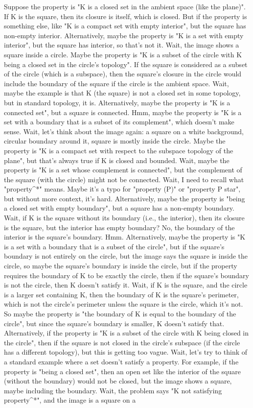 Suppose the property is "K is a closed set in the ambient space (like the plane)". If K is the square, then its closure is itself, which is closed. But if the property is something else, like "K is a compact set with empty interior", but the square has non-empty interior. Alternatively, maybe the property is "K is a set with empty interior", but the square has interior, so that's not it. Wait, the image shows a square inside a circle. Maybe the property is "K is a subset of the circle with K being a closed set in the circle's topology". If the square is considered as a subset of the circle (which is a subspace), then the square's closure in the circle would include the boundary of the square if the circle is the ambient space. Wait, maybe the example is that K (the square) is not a closed set in some topology, but in standard topology, it is. Alternatively, maybe the property is "K is a connected set", but a square is connected. Hmm, maybe the property is "K is a set with a boundary that is a subset of its complement", which doesn't make sense. Wait, let's think about the image again: a square on a white background, circular boundary around it, square is mostly inside the circle. Maybe the property is "K is a compact set with respect to the subspace topology of the plane", but that's always true if K is closed and bounded. Wait, maybe the property is "K is a set whose complement is connected", but the complement of the square (with the circle) might not be connected. Wait, I need to recall what "property^*" means. Maybe it's a typo for "property (P)" or "property P star", but without more context, it's hard. Alternatively, maybe the property is "being a closed set with empty boundary", but a square has a non-empty boundary. Wait, if K is the square without its boundary (i.e., the interior), then its closure is the square, but the interior has empty boundary? No, the boundary of the interior is the square's boundary. Hmm. Alternatively, maybe the property is "K is a set with a boundary that is a subset of the circle", but if the square's boundary is not entirely on the circle, but the image says the square is inside the circle, so maybe the square's boundary is inside the circle, but if the property requires the boundary of K to be exactly the circle, then if the square's boundary is not the circle, then K doesn't satisfy it. Wait, if K is the square, and the circle is a larger set containing K, then the boundary of K is the square's perimeter, which is not the circle's perimeter unless the square is the circle, which it's not. So maybe the property is "the boundary of K is equal to the boundary of the circle", but since the square's boundary is smaller, K doesn't satisfy that. Alternatively, if the property is "K is a subset of the circle with K being closed in the circle", then if the square is not closed in the circle's subspace (if the circle has a different topology), but this is getting too vague. Wait, let's try to think of a standard example where a set doesn't satisfy a property. For example, if the property is "being a closed set", then an open set like the interior of the square (without the boundary) would not be closed, but the image shows a square, maybe including the boundary. Wait, the problem says "K not satisfying property^*", and the image is a square on a 